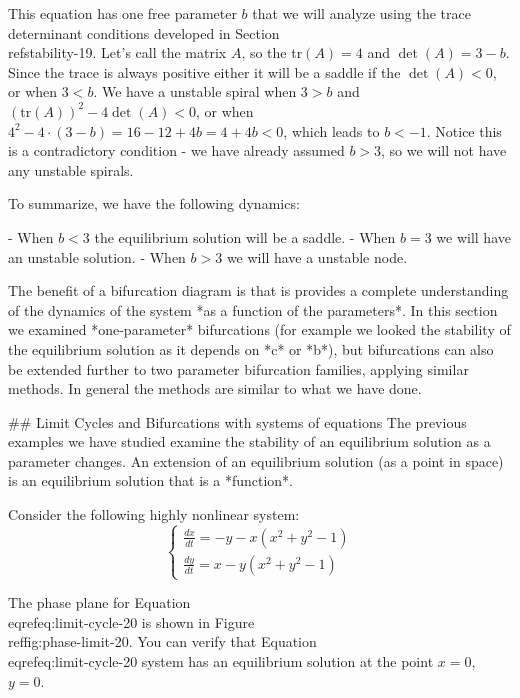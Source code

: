 \documentclass[
]{book}
\theoremstyle{definition}
\theoremstyle{definition}
\theoremstyle{definition}
\theoremstyle{remark}
\begin{document}
This equation has one free parameter $b$ that we will analyze using the trace determinant conditions developed in Section \\ref{stability-19}. Let's call the matrix $A$, so the tr$(A)=4$ and $\det(A)=3-b$.  Since the trace is always positive either it will be a saddle if the $\det(A)<0$, or when $3<b$.  We have a unstable spiral when $3>b$ and $(\mbox{tr}(A))^2-4 \det(A)<0$, or when $4^2-4\cdot(3-b) = 16-12+4b = 4+4b<0$, which leads to $b<-1$.  Notice this is a contradictory condition - we have already assumed $b>3$, so we will not have any unstable spirals.

To summarize, we have the following dynamics:

- When $b<3$ the equilibrium solution will be a saddle.
- When $b=3$ we will have an unstable solution.
- When $b>3$ we will have a unstable node.


The benefit of a bifurcation diagram is that is provides a complete understanding of the dynamics of the system *as a function of the parameters*.  In this section we examined *one-parameter* bifurcations (for example we looked the stability of the equilibrium solution as it depends on *c* or *b*), but bifurcations can also be extended further to two parameter bifurcation families, applying similar methods.  In general the methods are similar to what we have done.

## Limit Cycles and Bifurcations with systems of equations 
The previous examples we have studied examine the stability of an equilibrium solution as a parameter changes. An extension of an equilibrium solution (as a point in space) is an equilibrium solution that is a *function*. 

 Consider the following highly nonlinear system:
\begin{equation}
\begin{cases}
\frac{dx}{dt} =-y-x(x^2+y^2-1) \\ \label{eq:limit-cycle-20}
\frac{dy}{dt}=x-y(x^2+y^2-1)
\end{cases}
\end{equation}

The phase plane for Equation \\eqref{eq:limit-cycle-20} is shown in Figure \\ref{fig:phase-limit-20}. You can verify that Equation \\eqref{eq:limit-cycle-20} system has an equilibrium solution at the point  $x=0$, $y=0$. 
\end{document}
